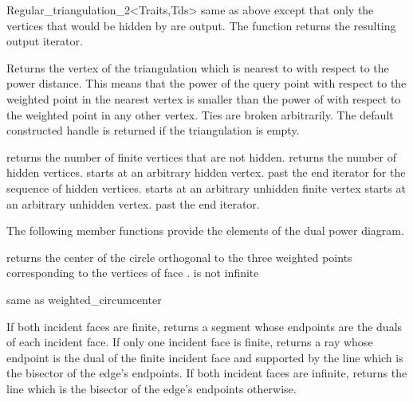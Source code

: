 \begin{ccRefClass}{Regular_triangulation_2<Traits,Tds>}
        {same as above except that only the vertices that would be hidden by  
          are output. The function returns the resulting output iterator.}

{Returns the vertex of the triangulation which is nearest to 
  with respect to the power distance. This means that the power of the
query point  with respect to the weighted point in the nearest
vertex is smaller than the power of  with respect to the
weighted point in any other vertex. Ties are broken arbitrarily. The
default constructed handle is returned if the triangulation is empty.}


{returns the number of finite vertices that are not hidden.}
\ccGlue
{}
{returns the number of hidden vertices.}
\ccGlue
{}
{starts at an arbitrary hidden vertex.}
\ccGlue
{}
{past the end iterator for the sequence of hidden vertices.}
\ccGlue
{}
{starts at an arbitrary unhidden finite vertex}
\ccGlue
{}
\ccGlue
{}
{starts at an arbitrary unhidden vertex.}
\ccGlue
{}
{past the end iterator.}

The following member functions provide the elements of the
dual power diagram.

{returns the center of the circle orthogonal to the three weighted
points corresponding to the vertices of face .
\ccPrecond {} is not infinite}

{same as weighted\_circumcenter}

{If both incident faces are finite, returns a segment whose endpoints are the
duals of each incident face. If only one incident face is finite, returns a
ray whose endpoint is the dual of the finite incident face and supported by
the line which is the bisector of the edge's endpoints. If both incident faces
are infinite, returns the line which is the bisector of the edge's endpoints
otherwise.  }


\end{ccRefClass}
